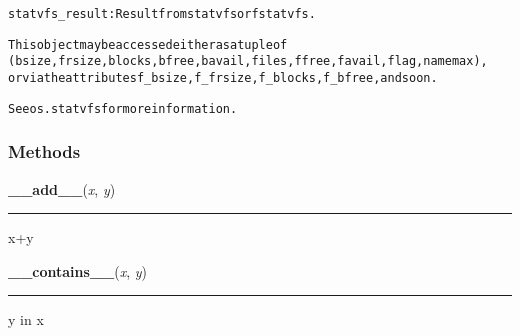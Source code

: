 \begin{alltt}
statvfs\_result: Result from statvfs or fstatvfs.

This object may be accessed either as a tuple of
  (bsize, frsize, blocks, bfree, bavail, files, ffree, favail, flag, namemax),
or via the attributes f\_bsize, f\_frsize, f\_blocks, f\_bfree, and so on.

See os.statvfs for more information.
\end{alltt}



  \subsubsection{Methods}

    \label{posix:statvfs_result:__add__}

    \vspace{0.5ex}

\hspace{.8\funcindent}\begin{boxedminipage}{\funcwidth}

    \raggedright \textbf{\_\_add\_\_}(\textit{x}, \textit{y})

    \vspace{-1.5ex}

    \rule{\textwidth}{0.5\fboxrule}
\setlength{\parskip}{2ex}
    x+y

\setlength{\parskip}{1ex}
    \end{boxedminipage}

    \label{posix:statvfs_result:__contains__}

    \vspace{0.5ex}

\hspace{.8\funcindent}\begin{boxedminipage}{\funcwidth}

    \raggedright \textbf{\_\_contains\_\_}(\textit{x}, \textit{y})

    \vspace{-1.5ex}

    \rule{\textwidth}{0.5\fboxrule}
\setlength{\parskip}{2ex}
    y in x

\setlength{\parskip}{1ex}
    \end{boxedminipage}

